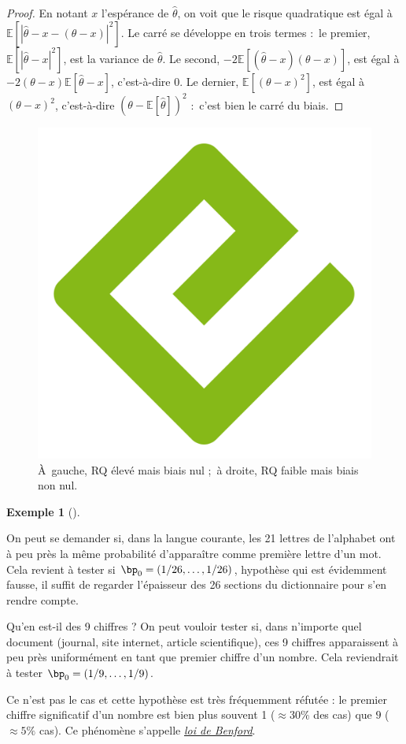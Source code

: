 \documentclass[
  10,
  letterpaper,
  DIV=11,
  numbers=noendperiod]{scrreport}
\theoremstyle{definition}
\theoremstyle{definition}
\newtheorem{example}{Exemple}[chapter]
\theoremstyle{plain}
\theoremstyle{remark}
\begin{document}
\begin{proof}
En notant \(x\) l'espérance de \(\hat{\theta}\), on voit que le risque
quadratique est égal à
\(\mathbb{E}[|\hat{\theta} - x - (\theta - x)|^2]\). Le carré se
développe en trois termes :~le premier,
\(\mathbb{E}[|\hat{\theta} - x|^2]\), est la variance de
\(\hat{\theta}\). Le second,
\(-2\mathbb{E}[(\hat{\theta} - x)(\theta - x)]\), est égal à
\(-2(\theta - x)\mathbb{E}[\hat{\theta} - x]\), c'est-à-dire 0. Le
dernier, \(\mathbb{E}[(\theta - x)^2]\), est égal à \((\theta - x)^2\),
c'est-à-dire \((\theta - \mathbb{E}[\hat{\theta}])^2\) :~c'est bien le
carré du biais.
\end{proof}

\begin{figure}[H]

{\centering \includegraphics[width=0.5\linewidth,height=\textheight,keepaspectratio]{images/cover.png}

}

\caption{À~gauche, RQ élevé mais biais nul ;~à droite, RQ faible mais
biais non nul.}

\end{figure}%

\begin{example}[]\protect\hypertarget{exm-testadeq}{}\label{exm-testadeq}

On peut se demander si, dans la langue courante, les 21 lettres de
l'alphabet ont à peu près la même probabilité d'apparaître comme
première lettre d'un mot. Cela revient à tester si
\(\bp_0=(1/26, \dotsc, 1/26)\), hypothèse qui est évidemment fausse, il
suffit de regarder l'épaisseur des 26 sections du dictionnaire pour s'en
rendre compte.

Qu'en est-il des 9 chiffres ? On peut vouloir tester si, dans n'importe
quel document (journal, site internet, article scientifique), ces 9
chiffres apparaissent à peu près uniformément en tant que premier
chiffre d'un nombre. Cela reviendrait à tester
\(\bp_0 = (1/9, \dotsc, 1/9)\).

Ce n'est pas le cas et cette hypothèse est très fréquemment réfutée : le
premier chiffre significatif d'un nombre est bien plus souvent 1
(\(\approx 30\%\) des cas) que \(9\) (\(\approx 5\%\) cas). Ce phénomène
s'appelle \href{https://fr.wikipedia.org/wiki/Loi_de_Benford}{\emph{loi
de Benford}}.

\end{example}
\end{document}
